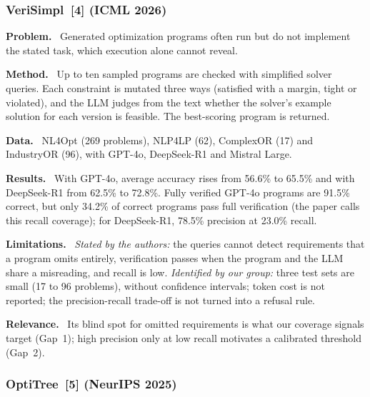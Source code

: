 \documentclass[11pt,a4paper]{article}
\newcommand{\elem}[1]{\par\noindent\textbf{#1.}~}
\begin{document}
\subsubsection[VeriSimpl (ICML 2026)]{VeriSimpl~[4] (ICML 2026)}

\elem{Problem} Generated optimization programs often run but do not implement the stated task, which execution alone cannot reveal.
\elem{Method} Up to ten sampled programs are checked with simplified solver queries. Each constraint is mutated three ways (satisfied with a margin, tight or violated), and the LLM judges from the text whether the solver's example solution for each version is feasible. The best-scoring program is returned.
\elem{Data} NL4Opt (269 problems), NLP4LP (62), ComplexOR (17) and IndustryOR (96), with GPT-4o, DeepSeek-R1 and Mistral Large.
\elem{Results} With GPT-4o, average accuracy rises from 56.6\% to 65.5\% and with DeepSeek-R1 from 62.5\% to 72.8\%. Fully verified GPT-4o programs are 91.5\% correct, but only 34.2\% of correct programs pass full verification (the paper calls this recall coverage); for DeepSeek-R1, 78.5\% precision at 23.0\% recall.
\elem{Limitations} \textit{Stated by the authors:} the queries cannot detect requirements that a program omits entirely, verification passes when the program and the LLM share a misreading, and recall is low. \textit{Identified by our group:} three test sets are small (17 to 96 problems), without confidence intervals; token cost is not reported; the precision-recall trade-off is not turned into a refusal rule.
\elem{Relevance} Its blind spot for omitted requirements is what our coverage signals target (Gap~1); high precision only at low recall motivates a calibrated threshold (Gap~2).

\subsubsection[OptiTree (NeurIPS 2025)]{OptiTree~[5] (NeurIPS 2025)}
\end{document}
